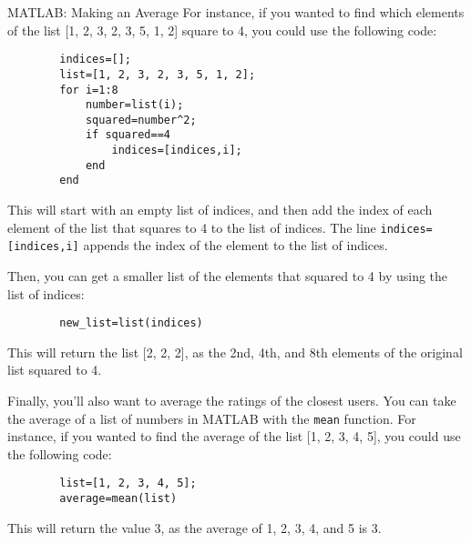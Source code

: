 \documentclass{ximera}
\begin{document}
\begin{exploration}
\begin{remark}{MATLAB: Making an Average}
      For instance, if you wanted to find which elements of the list [1, 2, 3, 2, 3, 5, 1, 2] square to 4, you could use the following code:

    \begin{verbatim}
        indices=[];
        list=[1, 2, 3, 2, 3, 5, 1, 2];
        for i=1:8
            number=list(i);
            squared=number^2;
            if squared==4
                indices=[indices,i];
            end
        end
    \end{verbatim}

      
      This will start with an empty list of indices, and then add the index of each element of the list that squares to 4 to the list of indices. The line \texttt{indices=[indices,i]} appends the index of the element to the list of indices.

      Then, you can get a smaller list of the elements that squared to 4 by using the list of indices:

    \begin{verbatim}
        new_list=list(indices)
    \end{verbatim}


      This will return the list [2, 2, 2], as the 2nd, 4th, and 8th elements of the original list squared to 4.

      Finally, you'll also want to average the ratings of the closest users. You can take the average of a list of numbers in MATLAB with the \texttt{mean} function. For instance, if you wanted to find the average of the list [1, 2, 3, 4, 5], you could use the following code:

    \begin{verbatim}
        list=[1, 2, 3, 4, 5];
        average=mean(list)        
    \end{verbatim}


      This will return the value 3, as the average of 1, 2, 3, 4, and 5 is 3.

  \end{remark}
      
\end{exploration}
\end{document}
